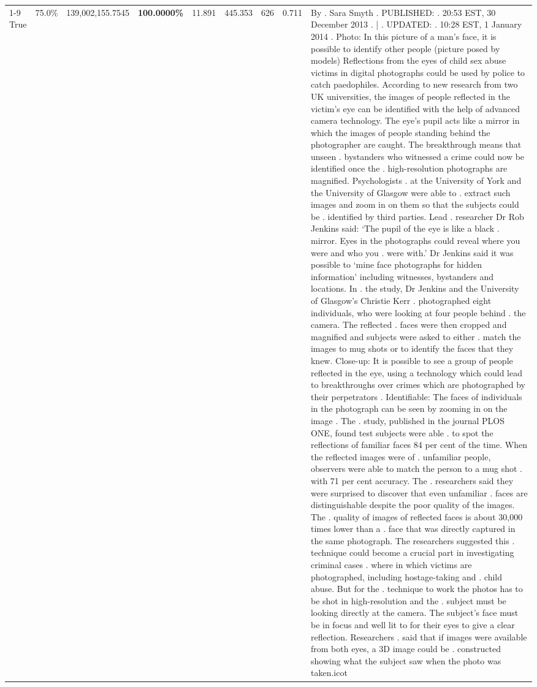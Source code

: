 \begin{table}[H]
\begin{tabular}{lllrlllll}
\cline{1-9}
True & 75.0\% & 139,002,155.7545 & \bfseries \color{red} 100.0000\% & 11.891 & 445.353 & 626 & 0.711 & By . Sara Smyth . PUBLISHED: . 20:53 EST, 30 December 2013 . | . UPDATED: . 10:28 EST, 1 January 2014 . Photo: In this picture of a man's face, it is possible to identify other people (picture posed by models) Reflections from the eyes of child sex abuse victims in digital photographs could be used by police to catch paedophiles. According to new research from two UK universities, the images of people reflected in the victim's eye can be identified with the help of advanced camera technology. The eye's pupil acts like a mirror in which the images of people standing behind the photographer are caught. The breakthrough means that unseen . bystanders who witnessed a crime could now be identified once the . high-resolution photographs are magnified. Psychologists . at the University of York and the University of Glasgow were able to . extract such images and zoom in on them so that the subjects could be . identified by third parties. Lead . researcher Dr Rob Jenkins said: ‘The pupil of the eye is like a black . mirror. Eyes in the photographs could reveal where you were and who you . were with.' Dr Jenkins said it was possible to ‘mine face photographs for hidden information' including witnesses, bystanders and locations. In . the study, Dr Jenkins and the University of Glasgow's Christie Kerr . photographed eight individuals, who were looking at four people behind . the camera. The reflected . faces were then cropped and magnified and subjects were asked to either . match the images to mug shots or to identify the faces that they knew. Close-up: It is possible to see a group of people reflected in the eye, using a technology which could lead to breakthroughs over crimes which are photographed by their perpetrators . Identifiable: The faces of individuals in the photograph can be seen by zooming in on the image . The . study, published in the journal PLOS ONE, found test subjects were able . to spot the reflections of familiar faces 84 per cent of the time. When the reflected images were of . unfamiliar people, observers were able to match the person to a mug shot . with 71 per cent accuracy. The . researchers said they were surprised to discover that even unfamiliar . faces are distinguishable despite the poor quality of the images. The . quality of images of reflected faces is about 30,000 times lower than a . face that was directly captured in the same photograph. The researchers suggested this . technique could become a crucial part in investigating criminal cases . where in which victims are photographed, including hostage-taking and . child abuse. But for the . technique to work the photos has to be shot in high-resolution and the . subject must be looking directly at the camera. The subject's face must be in focus and well lit to for their eyes to give a clear reflection. Researchers . said that if images were available from both eyes, a 3D image could be . constructed showing what the subject saw when the photo was taken.icot \\

\end{tabular}
\end{table}
